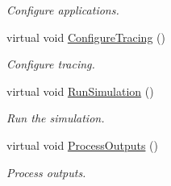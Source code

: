 \begin{DoxyCompactItemize}
$$\begin{DoxyCompactList}\small\item\em Configure applications. \end{DoxyCompactList}\item 
virtual void \hyperlink{classVanetRoutingExperiment_a8e298dd2353eae14bbf00009e728885e}{Configure\+Tracing} ()
\begin{DoxyCompactList}\small\item\em Configure tracing. \end{DoxyCompactList}\item 
virtual void \hyperlink{classVanetRoutingExperiment_a1dfce2ceec687bd91890e92536f5aaec}{Run\+Simulation} ()
\begin{DoxyCompactList}\small\item\em Run the simulation. \end{DoxyCompactList}\item 
virtual void \hyperlink{classVanetRoutingExperiment_ac3892b3643ab2f45667d8800676edfd7}{Process\+Outputs} ()
\begin{DoxyCompactList}\small\item\em Process outputs. \end{DoxyCompactList}\end{DoxyCompactItemize}
